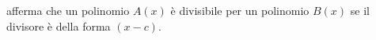 afferma che un polinomio $A(x)$ è divisibile per un polinomio $B(x)$
se il divisore è della forma $(x-c)$.
